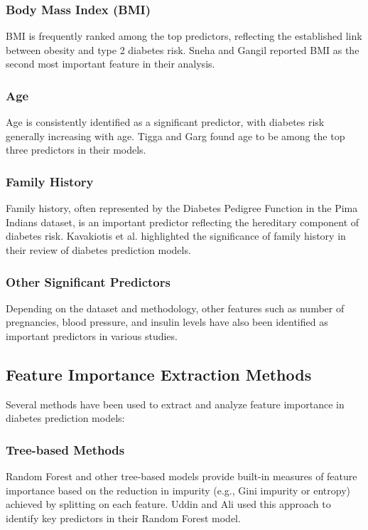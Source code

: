 \documentclass[journal]{IEEEtran}
\begin{document}
\subsubsection{Body Mass Index (BMI)}
BMI is frequently ranked among the top predictors, reflecting the established link between obesity and type 2 diabetes risk. Sneha and Gangil \cite{sneha2019} reported BMI as the second most important feature in their analysis.

\subsubsection{Age}
Age is consistently identified as a significant predictor, with diabetes risk generally increasing with age. Tigga and Garg \cite{tigga2020} found age to be among the top three predictors in their models.

\subsubsection{Family History}
Family history, often represented by the Diabetes Pedigree Function in the Pima Indians dataset, is an important predictor reflecting the hereditary component of diabetes risk. Kavakiotis et al. \cite{kavakiotis2017} highlighted the significance of family history in their review of diabetes prediction models.

\subsubsection{Other Significant Predictors}
Depending on the dataset and methodology, other features such as number of pregnancies, blood pressure, and insulin levels have also been identified as important predictors in various studies.

\subsection{Feature Importance Extraction Methods}
Several methods have been used to extract and analyze feature importance in diabetes prediction models:

\subsubsection{Tree-based Methods}
Random Forest and other tree-based models provide built-in measures of feature importance based on the reduction in impurity (e.g., Gini impurity or entropy) achieved by splitting on each feature. Uddin and Ali \cite{uddin2023} used this approach to identify key predictors in their Random Forest model.
\end{document}

